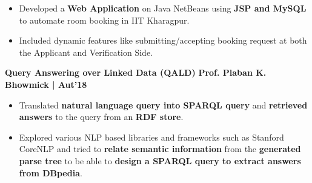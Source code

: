 \documentclass[10pt]{article}
\begin{document}
\begin{itemize}
    \item Developed a \textbf{Web Application} on Java NetBeans using \textbf{JSP and MySQL} to automate room booking in IIT Kharagpur.\\[-1.9em]
    \item Included dynamic features like submitting/accepting booking request at both the Applicant and Verification Side.\\[-1em]
\end{itemize}
\vspace{-0.5ex}
\large {\textbf{Query Answering over Linked Data (QALD)}} \normalsize \href{https://github.com/shmundhra/QALD}{\hspace{0.5ex}\faGithub} {\hfill} \textbf{Prof. Plaban K. Bhowmick | Aut'18}\\[-1.75em]
\begin{itemize}
    \item Translated \textbf{natural language query into SPARQL query} and \textbf{retrieved answers} to the query from an \textbf{RDF store}.\\[-1.9em]
    \item Explored various NLP based libraries and frameworks such as Stanford CoreNLP and tried to \textbf{relate semantic information} from the \textbf{generated parse tree} to be able to \textbf{design a SPARQL query to extract answers from DBpedia}.\\[-1em]
\end{itemize}
\end{document}
